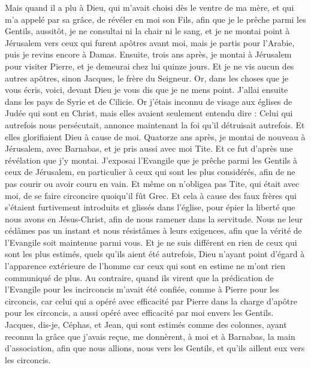 \begin{multicols}{2}
Mais quand il a plu à Dieu, qui m'avait choisi dès le ventre de ma mère, et qui m'a appelé par sa grâce,
de révéler en moi son Fils, afin que je le prêche parmi les Gentils, aussitôt, je ne consultai ni la chair ni le sang,
et je ne montai point à Jérusalem vers ceux qui furent apôtres avant moi, mais je partis pour l’Arabie, puis je revins encore à Damas.
Ensuite, trois ans après, je montai à Jérusalem pour visiter Pierre, et je demeurai chez lui quinze jours.
Et je ne vis aucun des autres apôtres, sinon Jacques, le frère du Seigneur.
Or, dans les choses que je vous écris, voici, devant Dieu je vous dis que je ne mens point.
J'allai ensuite dans les pays de Syrie et de Cilicie.
Or j'étais inconnu de visage aux églises de Judée qui sont en Christ,
mais elles avaient seulement entendu dire : Celui qui autrefois nous persécutait, annonce maintenant la foi qu'il détruisait autrefois.
Et elles glorifiaient Dieu à cause de moi.
\VerseOne{}Quatorze ans après, je montai de nouveau à Jérusalem, avec Barnabas, et je pris aussi avec moi Tite.
Et ce fut d’après une révélation que j'y montai. J’exposai l'Evangile que je prêche parmi les Gentils à ceux de Jérusalem, en particulier à ceux qui sont les plus considérés, afin de ne pas courir ou avoir couru en vain.
Et même on n’obligea pas Tite, qui était avec moi, de se faire circoncire quoiqu’il fût Grec.
Et cela à cause des faux frères qui s’étaient furtivement introduits et glissés dans l'église, pour épier la liberté que nous avons en Jésus-Christ, afin de nous ramener dans la servitude.
Nous ne leur cédâmes pas un instant et nous résistâmes à leurs exigences, afin que la vérité de l'Evangile soit maintenue parmi vous.
Et je ne suis différent en rien de ceux qui sont les plus estimés, quels qu’ils aient été autrefois, Dieu n’ayant point d’égard à l’apparence extérieure de l’homme car ceux qui sont en estime ne m’ont rien communiqué de plus.
Au contraire, quand ils virent que la prédication de l'Evangile pour les incirconcis m’avait été confiée, comme à Pierre pour les circoncis,
car celui qui a opéré avec efficacité par Pierre dans la charge d’apôtre pour les circoncis, a aussi opéré avec efficacité par moi envers les Gentils.
Jacques, dis-je, Céphas, et Jean, qui sont estimés comme des colonnes, ayant reconnu la grâce que j'avais reçue, me donnèrent, à moi et à Barnabas, la main d'association, afin que nous allions, nous vers les Gentils, et qu’ils aillent eux vers les circoncis.

\end{multicols}
